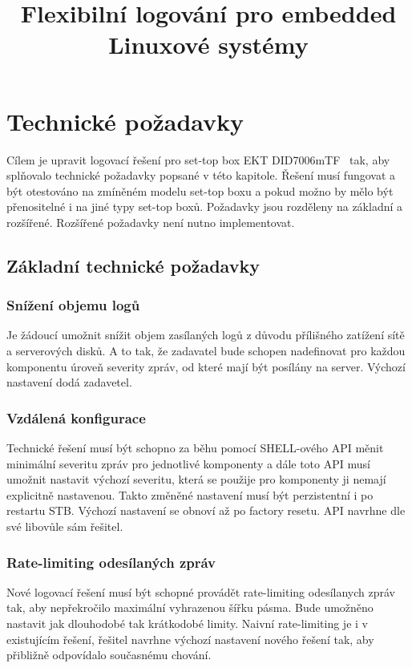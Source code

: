 \documentclass[thesis=B,czech]{FITthesis}[2012/06/26]
\title{Flexibilní logování pro embedded Linuxové systémy}
\begin{document}

\begin{introduction}

\end{introduction}

\chapter{Technické požadavky}
Cílem je upravit logovací řešení pro set-top box EKT DID7006mTF~\cite{ekt7006} tak, aby splňovalo technické požadavky popsané v této kapitole. Řešení musí fungovat a být otestováno na zmíněném modelu set-top boxu a pokud možno by mělo být přenositelné i na jiné typy set-top boxů.
Požadavky jsou rozděleny na základní a rozšířené. Rozšířené požadavky není nutno implementovat.

\section{Základní technické požadavky}

\subsection{Snížení objemu logů}
Je žádoucí umožnit snížit objem zasílaných logů z důvodu přílišného zatížení sítě a serverových disků. A to tak, že zadavatel bude schopen nadefinovat pro každou komponentu úroveň severity zpráv, od které mají být posílány na server. Výchozí nastavení dodá zadavetel.

\subsection{Vzdálená konfigurace}
Technické řešení musí být schopno za běhu pomocí SHELL-ového API měnit minimální severitu zpráv pro jednotlivé komponenty a dále toto API musí umožnit nastavit výchozí severitu, která se použije pro komponenty ji nemají explicitně nastavenou. Takto změněné nastavení musí být perzistentní i po restartu STB. Výchozí nastavení se obnoví až po factory resetu. API navrhne dle své libovůle sám řešitel.

\subsection{Rate-limiting odesílaných zpráv}
Nové logovací řešení musí být schopné provádět rate-limiting odesílanych zpráv tak, aby nepřekročilo maximální vyhrazenou šířku pásma. Bude umožněno nastavit jak dlouhodobé tak krátkodobé limity. Naivní rate-limiting je i v existujícím řešení, řešitel navrhne výchozí nastavení nového řešení tak, aby přibližně odpovídalo současnému chování. 
\end{document}
